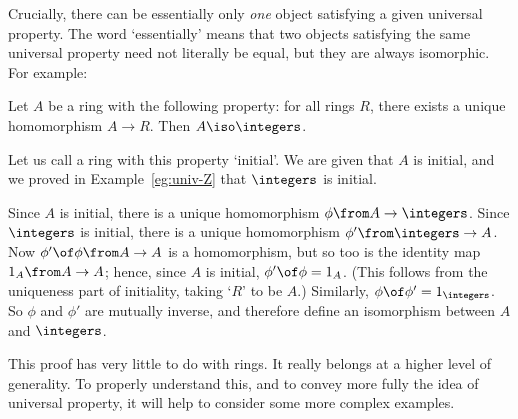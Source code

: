 Crucially, there can be essentially only \emph{one} object satisfying a
given universal property.  The word `essentially' means that two objects
satisfying the same universal property need not literally be equal, but
they are always isomorphic.  For example: 

\begin{ilemma}  
\label{lemma:Z-unique}
%
%
Let $A$ be a ring with the following property: for all rings $R$, there exists
a unique homomorphism $A \to R$.  Then $A \iso \integers$.
\end{ilemma}

\begin{pf}
Let us call a ring with this property `initial'.  We are given that $A$
is initial, and we proved in Example~\ref{eg:univ-Z} that $\integers$ is
initial.  

Since $A$ is initial, there is a unique homomorphism $\phi\from A \to
\integers$.  Since $\integers$ is initial, there is a unique homomorphism
$\phi'\from \integers \to A$.  Now $\phi' \of \phi \from A \to A$ is a
homomorphism, but so too is the identity map $1_A\from A \to A$; hence,
since $A$ is initial, $\phi' \of \phi = 1_A$.  (This follows from the
uniqueness part of initiality, taking `$R$' to be $A$.)  Similarly, $\phi
\of \phi' = 1_\integers$.  So $\phi$ and $\phi'$ are mutually inverse, and
therefore define an isomorphism between $A$ and $\integers$.
\end{pf}

This proof has very little to do with rings.  It really belongs at a higher
level of generality.  To properly understand this, and to convey more fully
the idea of universal property, it will help to consider some more
complex examples.

